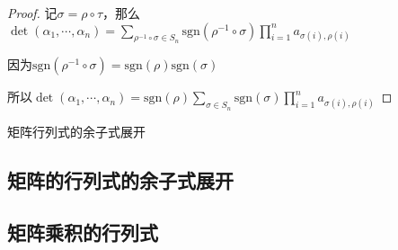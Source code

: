 \documentclass[12pt, a4paper, oneside, UTF8]{ctexbook}
\begin{document}
\begin{para}{0}
\begin{proof}
						记$\sigma =\rho \circ \tau $，那么$\det(\alpha_1,\cdots,\alpha_n)=\sum_{\rho^{-1} \circ \sigma  \in S_n} \text{sgn}(\rho^{-1} \circ \sigma) \prod_{i=1}^n a_{\sigma (i),\rho (i)}$

						因为$\text{sgn}(\rho^{-1} \circ \sigma)=\text{sgn}(\rho )\text{sgn}(\sigma )$

						所以$\det(\alpha_1,\cdots,\alpha_n)=\text{sgn}(\rho )\sum_{\sigma \in S_n} \text{sgn}(\sigma) \prod_{i=1}^n a_{\sigma(i),\rho (i)}$
					\end{proof}
					\begin{them}{矩阵行列式的余子式展开}{}
						
					\end{them}
			\end{para}
		\subsection{矩阵的行列式的余子式展开}
		\subsection{矩阵乘积的行列式}
\ifx\allfiles\undefined
\end{document}
